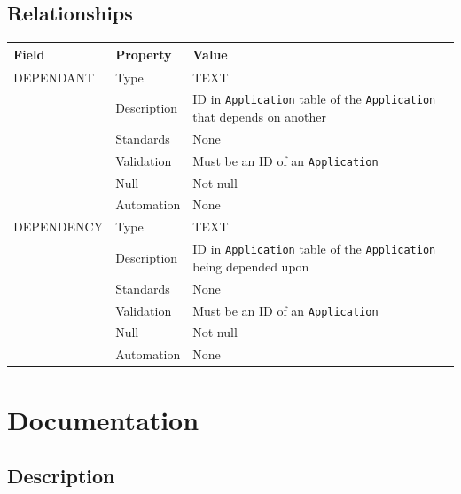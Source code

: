 \documentclass[
]{article}
\newcounter{none}
\begin{document}
\subsection{Relationships}\label{relationships-8}

{\def\LTcaptype{none} 
\begin{longtable}[]{@{}
  >{\raggedright\arraybackslash}p{}
  >{\raggedright\arraybackslash}p{}
  >{\raggedright\arraybackslash}p{}@{}}
\toprule\noalign{}
\begin{minipage}[b]{\linewidth}\raggedright
Field
\end{minipage} & \begin{minipage}[b]{\linewidth}\raggedright
Property
\end{minipage} & \begin{minipage}[b]{\linewidth}\raggedright
Value
\end{minipage} \\
\midrule\noalign{}
\endhead
\bottomrule\noalign{}
\endlastfoot
DEPENDANT & Type & TEXT \\
& Description & ID in \texttt{Application} table of the
\texttt{Application} that depends on another \\
& Standards & None \\
& Validation & Must be an ID of an \texttt{Application} \\
& Null & Not null \\
& Automation & None \\
DEPENDENCY & Type & TEXT \\
& Description & ID in \texttt{Application} table of the
\texttt{Application} being depended upon \\
& Standards & None \\
& Validation & Must be an ID of an \texttt{Application} \\
& Null & Not null \\
& Automation & None \\
\end{longtable}
}

\section{Documentation}\label{documentation}

\subsection{Description}\label{description-11}
\end{document}
